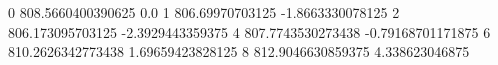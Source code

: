 0 808.5660400390625 0.0
1 806.69970703125 -1.8663330078125
2 806.173095703125 -2.3929443359375
4 807.7743530273438 -0.79168701171875
6 810.2626342773438 1.69659423828125
8 812.9046630859375 4.338623046875
